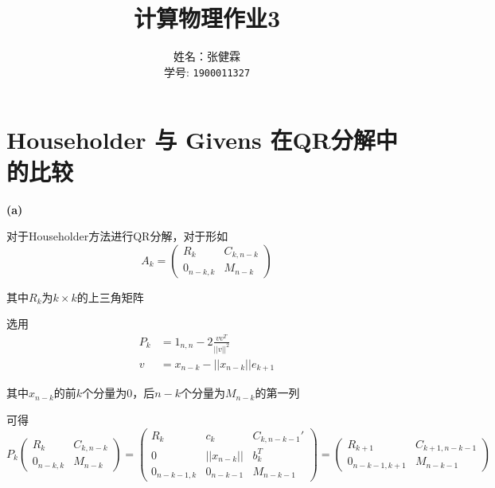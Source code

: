 \documentclass[UTF8]{ctexart}
\begin{document}
\title{计算物理作业3}
\author{姓名：张健霖\\学号: \texttt{1900011327}}
\maketitle

\section{Householder 与 Givens 在QR分解中的比较}

\noindent\textbf{(a)}

对于Householder方法进行QR分解，对于形如
\begin{equation}\label{1-a-1}
A_k=\left(
    \begin{array}{cc}
        R_{k} & C_{k,n-k}\\
        0_{n-k,k} & M_{n-k}
    \end{array}
\right)
\end{equation}

其中$R_{k}$为$k\times k$的上三角矩阵

选用
\begin{equation}\label{1-a-2}
    \begin{aligned}
        P_k&=1_{n,n}-2\frac{vv^T}{||v||^2}\\
        v&=x_{n-k}-||x_{n-k}||e_{k+1}
    \end{aligned}
\end{equation}

其中$x_{n-k}$的前$k$个分量为0，后$n-k$个分量为$M_{n-k}$的第一列

可得
\begin{equation}\label{1-a-3}
    P_k\left(
        \begin{array}{cc}
            R_{k} & C_{k,n-k}\\
            0_{n-k,k} & M_{n-k}
        \end{array}
    \right)
    =\left(
        \begin{array}{ccc}
            R_{k} & c_{k} & C_{k,n-k-1}'\\
            0 & ||x_{n-k}|| & b_{k}^T\\
            0_{n-k-1,k} & 0_{n-k-1} & M_{n-k-1}
        \end{array}
    \right)
    =\left(
        \begin{array}{cc}
            R_{k+1} & C_{k+1,n-k-1}\\
            0_{n-k-1,k+1} & M_{n-k-1}
        \end{array}
    \right)
\end{equation}
\end{document}
